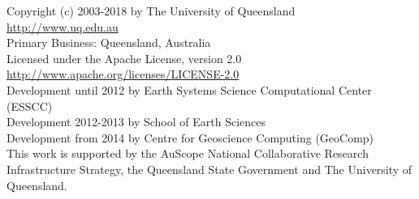
%
%
%

\begin{center}
Copyright (c) 2003-2018 by The University of Queensland\\
\url{http://www.uq.edu.au}\\
Primary Business: Queensland, Australia\\
Licensed under the Apache License, version 2.0\\
\url{http://www.apache.org/licenses/LICENSE-2.0}\\
Development until 2012 by Earth Systems Science Computational Center (ESSCC)\\
Development 2012-2013 by School of Earth Sciences\\
Development from 2014 by Centre for Geoscience Computing (GeoComp)\\

This work is supported by the AuScope National Collaborative Research
Infrastructure Strategy, the Queensland State Government and The University
of Queensland.
\end{center}

